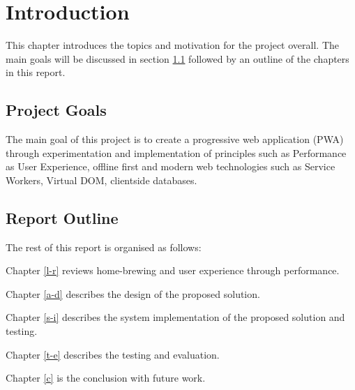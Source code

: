 \chapter{Introduction} \label{i}

This chapter introduces the topics and motivation for the project overall. The main goals will be discussed in section \ref{i--project-goals} followed by an outline of the chapters in this report.

\section{Project Goals} \label{i--project-goals}

The main goal of this project is to create a progressive web application (PWA) through experimentation and implementation of principles such as Performance as User Experience, offline first and modern web technologies such as Service Workers, Virtual DOM, clientside databases.

\section{Report Outline} \label{i--report-outline}

The rest of this report is organised as follows:

Chapter \ref{l-r} reviews home-brewing and user experience through performance.

Chapter \ref{a-d} describes the design of the proposed solution.

Chapter \ref{s-i} describes the system implementation of the proposed solution and testing.

Chapter \ref{t-e} describes the testing and evaluation.

Chapter \ref{c} is the conclusion with future work.
